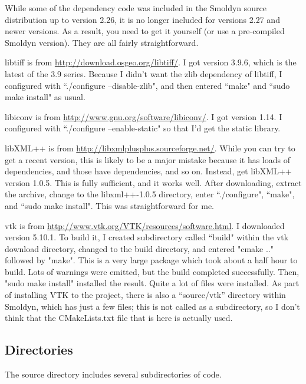 \documentclass {book}
\begin{document}
While some of the dependency code was included in the Smoldyn source distribution up to version 2.26, it is no longer included for versions 2.27 and newer versions. As a result, you need to get it yourself (or use a pre-compiled Smoldyn version). They are all fairly straightforward.

libtiff is from \url{http://download.osgeo.org/libtiff/}. I got version 3.9.6, which is the latest of the 3.9 series. Because I didn't want the zlib dependency of libtiff, I configured with ``./configure --disable-zlib", and then entered ``make" and ``sudo make install" as usual.

libiconv is from \url{http://www.gnu.org/software/libiconv/}. I got version 1.14. I configured with ``./configure --enable-static" so that I'd get the static library.

libXML++ is from \url{http://libxmlplusplus.sourceforge.net/}. While you can try to get a recent version, this is likely to be a major mistake because it has loads of dependencies, and those have dependencies, and so on. Instead, get libXML++ version 1.0.5. This is fully sufficient, and it works well. After downloading, extract the archive, change to the libxml++-1.0.5 directory, enter ``./configure", ``make", and ``sudo make install". This was straightforward for me.

vtk is from \url{http://www.vtk.org/VTK/resources/software.html}. I downloaded version 5.10.1. To build it, I created subdirectory called ``build" within the vtk download directory, changed to the build directory, and entered "cmake .." followed by "make". This is a very large package which took about a half hour to build. Lots of warnings were emitted, but the build completed successfully. Then, "sudo make install" installed the result. Quite a lot of files were installed. As part of installing VTK to the project, there is also a ``source/vtk'' directory within Smoldyn, which has just a few files; this is not called as a subdirectory, so I don't think that the CMakeLists.txt file that is here is actually used.

\subsection{Directories}

The source directory includes several subdirectories of code.
\end{document}
